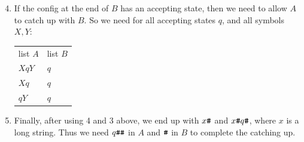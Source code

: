 \begin{frame}
\begin{enumerate}
\setcounter{enumi}{3}
\item If the config at the end of $B$ has an accepting state, then we need
to allow $A$ to catch up with $B$.  So we need for all accepting
states $q$, and all symbols $X,Y$:
\begin{center}
\begin{tabular}{ll}
list $A$ & list $B$ \\
$XqY$    & $q$ \\
$Xq$     & $q$ \\
$qY$     & $q$
\end{tabular}
\end{center}
\item Finally, after using 4 and 3 above, we end up with $x\texttt{\#}$ and
$x\texttt{\#} q\texttt{\#}$, where $x$ is a long string.  Thus we need $q\texttt{\#}\texttt{\#}$ in $A$ and
$\texttt{\#}$ in $B$ to complete the catching up.
\end{enumerate}
\end{frame}

